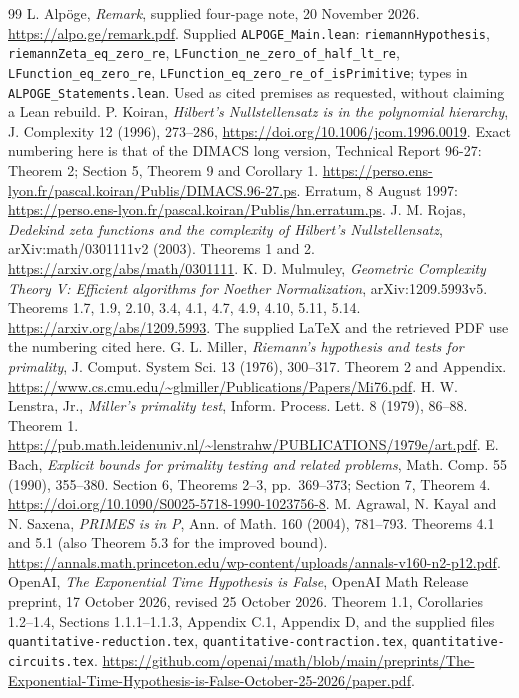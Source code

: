 \documentclass[11pt,a4paper]{article}
\begin{document}
\begin{thebibliography}{99}
 L. Alp\"oge, \emph{Remark}, supplied four-page note, 20 November 2026. \url{https://alpo.ge/remark.pdf}. Supplied \texttt{ALPOGE\_Main.lean}: \texttt{riemannHypothesis}, \texttt{riemannZeta\_eq\_zero\_re}, \texttt{LFunction\_ne\_zero\_of\_half\_lt\_re}, \texttt{LFunction\_eq\_zero\_re}, \texttt{LFunction\_eq\_zero\_re\_of\_isPrimitive}; types in \texttt{ALPOGE\_Statements.lean}. Used as cited premises as requested, without claiming a Lean rebuild.
 P. Koiran, \emph{Hilbert's Nullstellensatz is in the polynomial hierarchy}, J. Complexity 12 (1996), 273--286, \url{https://doi.org/10.1006/jcom.1996.0019}. Exact numbering here is that of the DIMACS long version, Technical Report 96-27: Theorem 2; Section 5, Theorem 9 and Corollary 1. \url{https://perso.ens-lyon.fr/pascal.koiran/Publis/DIMACS.96-27.ps}. Erratum, 8 August 1997: \url{https://perso.ens-lyon.fr/pascal.koiran/Publis/hn.erratum.ps}.
 J. M. Rojas, \emph{Dedekind zeta functions and the complexity of Hilbert's Nullstellensatz}, arXiv:math/0301111v2 (2003). Theorems 1 and 2. \url{https://arxiv.org/abs/math/0301111}.
 K. D. Mulmuley, \emph{Geometric Complexity Theory V: Efficient algorithms for Noether Normalization}, arXiv:1209.5993v5. Theorems 1.7, 1.9, 2.10, 3.4, 4.1, 4.7, 4.9, 4.10, 5.11, 5.14. \url{https://arxiv.org/abs/1209.5993}. The supplied LaTeX and the retrieved PDF use the numbering cited here.
 G. L. Miller, \emph{Riemann's hypothesis and tests for primality}, J. Comput. System Sci. 13 (1976), 300--317. Theorem 2 and Appendix. \url{https://www.cs.cmu.edu/~glmiller/Publications/Papers/Mi76.pdf}.
 H. W. Lenstra, Jr., \emph{Miller's primality test}, Inform. Process. Lett. 8 (1979), 86--88. Theorem 1. \url{https://pub.math.leidenuniv.nl/~lenstrahw/PUBLICATIONS/1979e/art.pdf}.
 E. Bach, \emph{Explicit bounds for primality testing and related problems}, Math. Comp. 55 (1990), 355--380. Section 6, Theorems 2--3, pp.~369--373; Section 7, Theorem 4. \url{https://doi.org/10.1090/S0025-5718-1990-1023756-8}.
 M. Agrawal, N. Kayal and N. Saxena, \emph{PRIMES is in P}, Ann. of Math. 160 (2004), 781--793. Theorems 4.1 and 5.1 (also Theorem 5.3 for the improved bound). \url{https://annals.math.princeton.edu/wp-content/uploads/annals-v160-n2-p12.pdf}.
 OpenAI, \emph{The Exponential Time Hypothesis is False}, OpenAI Math Release preprint, 17 October 2026, revised 25 October 2026. Theorem 1.1, Corollaries 1.2--1.4, Sections 1.1.1--1.1.3, Appendix C.1, Appendix D, and the supplied files \texttt{quantitative-reduction.tex}, \texttt{quantitative-contraction.tex}, \texttt{quantitative-circuits.tex}. \url{https://github.com/openai/math/blob/main/preprints/The-Exponential-Time-Hypothesis-is-False-October-25-2026/paper.pdf}.

\end{thebibliography}
\end{document}
